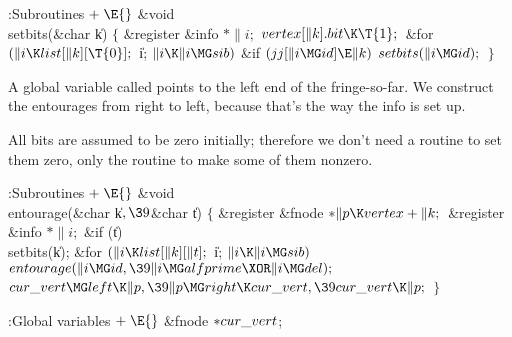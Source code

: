 \Y\B\4:Subroutines\X${}\mathrel+\E{}$\6
\&{void} \\{setbits}(\&{char} \|k)\1\1\2\2\6
${}\{{}$\1\6
\&{register} \&{info} ${}{*}\|i;{}$\7
${}\\{vertex}[\|k].\\{bit}\K\T{1};{}$\6
\&{for} ${}(\|i\K\\{list}[\|k][\T{0}];{}$ \|i; ${}\|i\K\|i\MG\\{sib}){}$\1\6
\&{if} ${}(\\{jj}[\|i\MG\\{id}]\E\|k){}$\1\5
${}\\{setbits}(\|i\MG\\{id});{}$\2\2\6
\4${}\}{}$\2\par
\fi

A global variable called  points to
the left end of the
fringe-so-far. We construct the entourages from right to left, because
that's the way the  info is set up.

All bits are assumed to be zero initially; therefore we don't need a
routine to set them zero, only the  routine to make
some of them nonzero.

\Y\B\4:Subroutines\X${}\mathrel+\E{}$\6
\&{void} \\{entourage}(\&{char} \|k${},\39{}$\&{char} \|t)\1\1\2\2\6
${}\{{}$\1\6
\&{register} \&{fnode} ${}{*}\|p\K\\{vertex}+\|k;{}$\6
\&{register} \&{info} ${}{*}\|i;{}$\7
\&{if} (\|t)\1\5
\\{setbits}(\|k);\2\6
\&{for} ${}(\|i\K\\{list}[\|k][\|t];{}$ \|i; ${}\|i\K\|i\MG\\{sib}){}$\1\5
${}\\{entourage}(\|i\MG\\{id},\39\|i\MG\\{alfprime}\XOR\|i\MG\\{del});{}$\2\6
${}\\{cur\_vert}\MG\\{left}\K\|p,\39\|p\MG\\{right}\K\\{cur\_vert},\39\\{cur%
\_vert}\K\|p;{}$\6
\4${}\}{}$\2\par
\fi

\B{}:Global variables\X${}\mathrel+\E{}$\6
\&{fnode} ${}{*}\\{cur\_vert}{}$;\par
\fi

